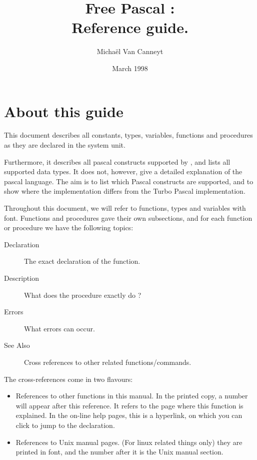 \documentclass{report}
\begin{document}
\title{Free Pascal :\\ Reference guide.}
\date{March 1998}
\author{Micha\"el Van Canneyt
}
\maketitle
\tableofcontents
\newpage
\listoftables
\newpage
\section*{About this guide}
This document describes all constants, types, variables, functions and
procedures as they are declared in the system unit.

Furthermore, it describes all pascal constructs supported by \fpc, and lists
all supported data types. It does not, however, give a detailed explanation
of the pascal language. The aim is to list which Pascal constructs are
supported, and to show where the \fpc implementation differs from the
Turbo Pascal implementation.

Throughout this document, we will refer to functions, types and variables
with  font. Functions and procedures gave their own
subsections, and for each function or procedure we have the following 
topics:
\begin{description}
\item [Declaration] The exact declaration of the function.
\item [Description] What does the procedure exactly do ?
\item [Errors] What errors can occur.
\item [See Also] Cross references to other related functions/commands.
\end{description}
The cross-references come in two flavours:
\begin{itemize}
\item References to other functions in this manual. In the printed copy, a
number will appear after this reference. It refers to the page where this
function is explained. In the on-line help pages, this is a hyperlink, on
which you can click to jump to the declaration.
\item References to Unix manual pages. (For linux related things only) they
are printed in  font, and the number after it is the Unix
manual section.
\end{itemize}
%
%
\end{document}
